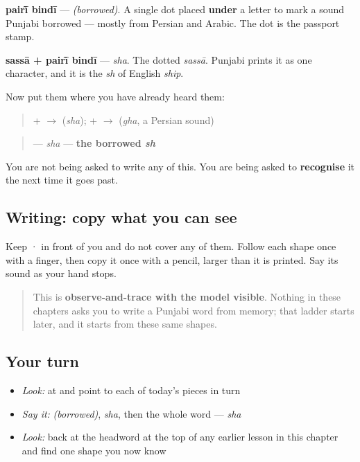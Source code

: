 \textbf{pairī̃ bindī} — \emph{(borrowed)}. A single dot placed \textbf{under} a letter to mark a sound Punjabi borrowed — mostly from Persian and Arabic. The dot is the passport stamp.

\begin{quote}
\end{quote}

\textbf{sassā + pairī̃ bindī} — \emph{sha}. The dotted \emph{sassā}. Punjabi prints it as one character, and it is the \emph{sh} of English \emph{ship}.

Now put them where you have already heard them:

\begin{quote}
\textbf{} + \textbf{} $\to$ \textbf{} (\emph{sha});  \textbf{} + \textbf{} $\to$ \textbf{} (\emph{gha}, a Persian sound)
\end{quote}

\begin{quote}
\textbf{} — \emph{sha} — \textbf{the borrowed \emph{sh}}
\end{quote}

You are not being asked to write any of this. You are being asked to \textbf{recognise} it the next time it goes past.

\subsection*{Writing: copy what you can see}
Keep  ·  in front of you and do not cover any of them. Follow each shape once with a finger, then copy it once with a pencil, larger than it is printed. Say its sound as your hand stops.

\begin{quote}
This is \textbf{observe-and-trace with the model visible}. Nothing in these chapters asks you to write a Punjabi word from memory; that ladder starts later, and it starts from these same shapes.
\end{quote}

\subsection*{Your turn}
\begin{itemize}
\raggedright
  \item \emph{Look:} at \textbf{} and point to each of today's pieces in turn
  \item \emph{Say it:} \emph{(borrowed)}, \emph{sha}, then the whole word — \emph{sha}
  \item \emph{Look:} back at the headword at the top of any earlier lesson in this chapter and find one shape you now know
\end{itemize}

